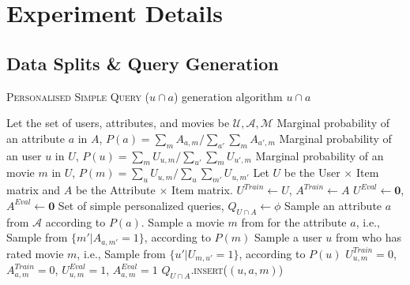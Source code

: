 
\section{Experiment Details}
\subsection{Data Splits \& Query Generation}
\label{app:data_split}

\begin{algorithm}
\caption{\textsc{Personalised Simple Query} ($u \cap a$) generation algorithm $u \cap a$}
\begin{algorithmic}[1]
    \STATE Let the set of users, attributes, and movies be $\mathcal{U}, \mathcal{A}, \mathcal{M}$
    \STATE Marginal probability of an attribute $a$ in $A$, $P(a) = \sum_{m} A_{a, m} / \sum_{a'} \sum_{m} A_{a', m}$
    \STATE Marginal probability of an user $u$ in $U$, $P(u) = \sum_{m} U_{u, m} / \sum_{u'} \sum_{m} U_{u', m}$
    \STATE Marginal probability of an movie $m$ in $U$, $P(m) = \sum_{u} U_{u, m} / \sum_{u} \sum_{m'} U_{u, m'}$
    \STATE Let $U$ be the User $\times$ Item matrix and $A$ be the Attribute $\times$ Item matrix.
    \STATE $U^{Train} \leftarrow U$, $A^{Train} \leftarrow A$
    \STATE $U^{Eval} \leftarrow \mathbf{0}$, $A^{Eval} \leftarrow \mathbf{0}$
    \STATE Set of simple personalized queries, $Q_{U \cap A} \leftarrow \phi$
        \STATE Sample an attribute $a$ from $\mathcal{A}$ according to $P(a)$.
        \STATE Sample a movie $m$ from for the attribute $a$, i.e., Sample from $\{m' | A_{a, m'} = 1\}$, according to $P(m)$
        \STATE Sample a user $u$ from who has rated movie $m$, i.e., Sample from  $\{u' | U_{m, u'} = 1\}$, according to $P(u)$
        \STATE $U^{Train}_{u, m} = 0$, $A^{Train}_{a, m} = 0$, $U^{Eval}_{u, m} = 1$, $A^{Eval}_{a, m} = 1$
        \STATE $Q_{U \cap A}$.\textsc{insert}($(u, a, m)$)
    \ENDWHILE
\end{algorithmic}
\label{alg:joint_sampling}
\end{algorithm}

